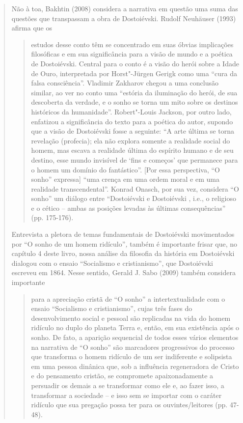 {\begin{quote}
Não à toa, Bakhtin (2008) considera a narrativa em questão uma suma das
questões que transpassam a obra de Dostoiévski. Rudolf Neuhäuser (1993)
afirma que os

\begin{quote}
estudos desse conto têm se concentrado em suas óbvias implicações
filosóficas e em sua significância para a visão de mundo e a poética de
Dostoiévski. Central para o conto é a visão do herói sobre a Idade de
Ouro, interpretada por Horst"-Jürgen Gerigk como uma ``cura da falsa
consciência''. Vladimir Zakharov chegou a uma conclusão similar, ao ver
no conto uma ``estória da iluminação do herói, de sua descoberta da
verdade, e o sonho se torna um mito sobre os destinos históricos da
humanidade''. Robert"-Louis Jackson, por outro lado, enfatizou a
significância do texto para a poética do autor, supondo que a visão de
Dostoiévski fosse a seguinte: ``A arte última se torna revelação
(profecia); ela não explora somente a realidade social do homem, mas
escava a realidade última do espírito humano e de seu destino, esse
mundo invisível de `fins e começos' que permanece para o homem um
domínio do fantástico''. {[}Por essa perspectiva, ``O sonho''
expressa{]} ``uma crença em uma ordem moral e em uma realidade
transcendental''. Konrad Onasch, por sua vez, considera ``O sonho'' um
diálogo entre ``Dostoiévski  e Dostoiévski , i.e., o religioso e o
cético -- ambas as posições levadas às últimas consequências'' (pp.
175-176).
\end{quote}

Entrevista a pletora de temas fundamentais de Dostoiévski movimentados
por ``O sonho de um homem ridículo''\emph{,} também é importante frisar
que, no capítulo 4 deste livro, nossa análise da filosofia da história
em Dostoiévski dialogou com o ensaio ``Socialismo e cristianismo'', que
Dostoiévski escreveu em 1864. Nesse sentido, Gerald J. Sabo (2009)
também considera importante

\begin{quote}
para a apreciação cristã de ``O sonho'' a intertextualidade com o ensaio
``Socialismo e cristianismo'', cujas três fases do desenvolvimento
social e pessoal são replicadas na vida do homem ridículo no duplo do
planeta Terra e, então, em sua existência após o sonho. De fato, a
aparição sequencial de todos esses vários elementos na narrativa de ``O
sonho'' são marcadores progressivos do processo que transforma o homem
ridículo de um ser indiferente e solipsista em uma pessoa dinânica que,
sob a influência regeneradora de Cristo e do pensamento cristão, se
compromete apaixonadamente a persuadir os demais a se transformar como
ele e, ao fazer isso, a transformar a sociedade -- e isso sem se
importar com o caráter ridículo que sua pregação possa ter para os
ouvintes/leitores (pp. 47-48).
\end{quote}


\end{quote}}
